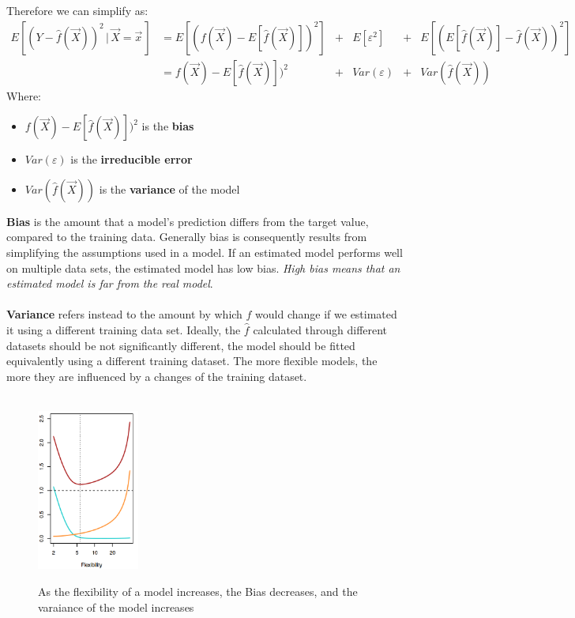     Therefore we can simplify as:
    \begin{align*}
    E[(Y-\hat{f}(\vec{X}))^2 \,|\, \vec{X} = \vec{x}\,]
    & = E[(f(\vec{X}) - E[\hat{f}(\vec{X})])^2] &+ &E[\varepsilon^2] &+ &E[(E[\hat{f}(\vec{X})] - \hat{f}(\vec{X}))^2] \\
    & = f(\vec{X}) - E[\hat{f}(\vec{X})])^2 &+ &Var(\varepsilon) &+ &Var(\hat{f}(\vec{X})) 
    \end{align*} 
    Where:
    \begin{itemize}
      \item $f(\vec{X}) - E[\hat{f}(\vec{X})])^2$ is the \textbf{bias}
      \item $Var(\varepsilon)$ is the \textbf{irreducible error}
      \item $Var(\hat{f}(\vec{X}))$ is the \textbf{variance} of the model
    \end{itemize}
    \textbf{Bias} is the amount that a model’s prediction differs from the
    target value, compared to the training data. Generally bias is consequently
    results from simplifying the assumptions used in a model. If an estimated
    model performs well on multiple data sets, the estimated model has low bias.
    \textit{High bias means that an estimated model is far from the real model}.
    \\\\
    \textbf{Variance} refers instead to the amount by which $\hat{f}$ would
    change if we estimated it using a different training data set. Ideally, the
    $\hat{f}$ calculated through different datasets should be not significantly
    different, the model should be fitted equivalently using a different
    training dataset. The more flexible models, the more they are influenced by
    a changes of the training dataset. \\\\

    \begin{figure}[h]
      \caption{  
      As the flexibility of a model increases, the Bias decreases, and the
      varaiance of the model increases}
      \centering
      \includegraphics[width=0.3\textwidth]{MSEdependsonVarianceandBias}
      \label{MSEVarianceBias}
      \end{figure}

